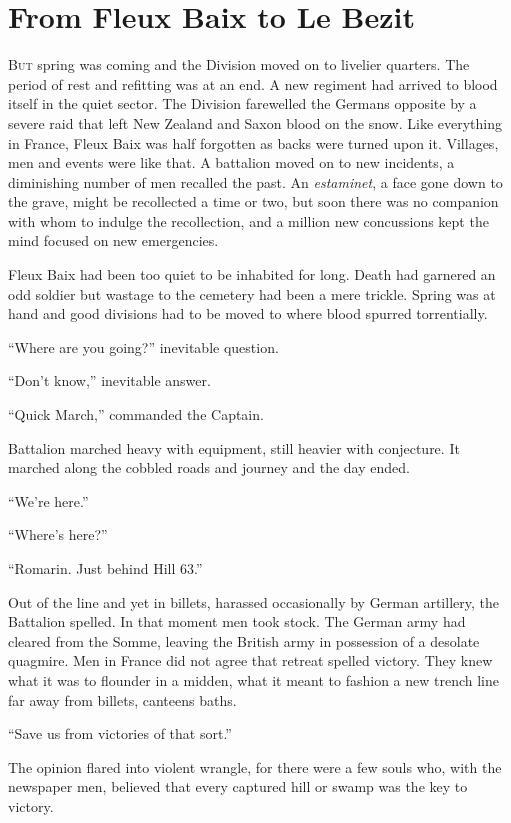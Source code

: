 \chapter*{\textsf{From Fleux Baix to Le Bezit}}

B\textsc{ut} spring was coming and the Division moved on to livelier quarters. The period of rest and refitting was at an end. A new regiment had arrived to blood itself in the quiet sector. The Division farewelled the Germans opposite by a severe raid that left New Zealand and Saxon blood on the snow. Like everything in France, Fleux Baix was half forgotten as backs were turned upon it. Villages, men and events were like that. A battalion moved on to new incidents, a diminishing number of men recalled the past. An \textit{estaminet}, a face gone down to the grave, might be recollected a time or two, but soon there was no companion with whom to indulge the recollection, and a million new concussions kept the mind focused on new emergencies.

Fleux Baix had been too quiet to be inhabited for long. Death had garnered an odd soldier but wastage to the cemetery had been a mere trickle. Spring was at hand and good divisions had to be moved to where blood spurred torrentially.

``Where are you going?'' inevitable question.

``Don't know,'' inevitable answer.

``Quick March,'' commanded the Captain.

Battalion marched heavy with equipment, still heavier with conjecture. It marched along the cobbled roads and journey and the day ended.

``We're here.''

``Where's here?''

``Romarin. Just behind Hill 63.''

Out of the line and yet in billets, harassed occasionally by German artillery, the Battalion spelled. In that moment men took stock. The German army had cleared from the Somme, leaving the British army in possession of a desolate quagmire. Men in France did not agree that retreat spelled victory. They knew what it was to flounder in a midden, what it meant to fashion a new trench line far away from billets, canteens baths.

``Save us from victories of that sort.''

The opinion flared into violent wrangle, for there were a few souls who, with the newspaper men, believed that every captured hill or swamp was the key to victory.

